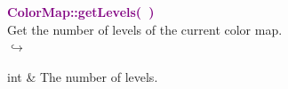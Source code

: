 
\textcolor{purple}{\textbf{ColorMap::getLevels(~)}}\label{ColorMap::getLevels()}\\
Get the number of levels of the current color map.\\ \hspace*{5mm}$\hookrightarrow$
\vspace*{-2em}\begin{tcolorbox}[grow to left by=-1cm, width=\textwidth-1cm,myArgs,tabularx={l|R}]
int & The number of levels.
\end{tcolorbox}



